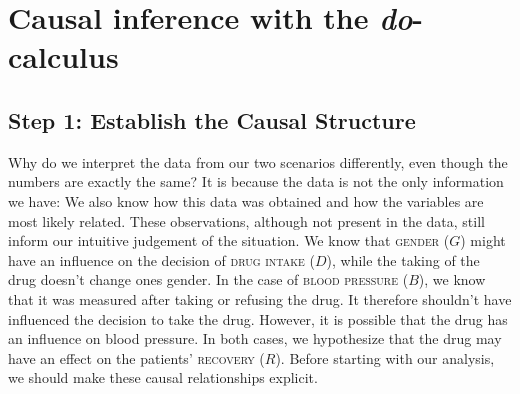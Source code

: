 \documentclass[nobib]{tufte-handout}
\newcommand{\docalc}{\emph{do}-calculus\xspace}
\begin{document}
\section{Causal inference with the \docalc} \label{sec:theory}
\subsection{Step 1: Establish the Causal Structure} \label{sec:step1}


Why do we interpret the data from our two scenarios differently, even though the numbers are exactly the same?
It is because the data is not the only information we have: We also know how this data was obtained and how the variables are most likely related. 
These observations, although not present in the data, still inform our intuitive judgement of the situation.
We know that \textsc{gender} ($G$) might have an influence on the decision of \textsc{drug intake} ($D$), while the taking of the drug doesn't change ones gender.
In the case of \textsc{blood pressure} ($B$), we know that it was measured after taking or refusing the drug.
It therefore shouldn't have influenced the decision to take the drug.
However, it is possible that the drug has an influence on blood pressure.
In both cases, we hypothesize that the drug may have an effect on the patients' \textsc{recovery} ($R$).
Before starting with our analysis, we should make these causal relationships explicit.
\end{document}
